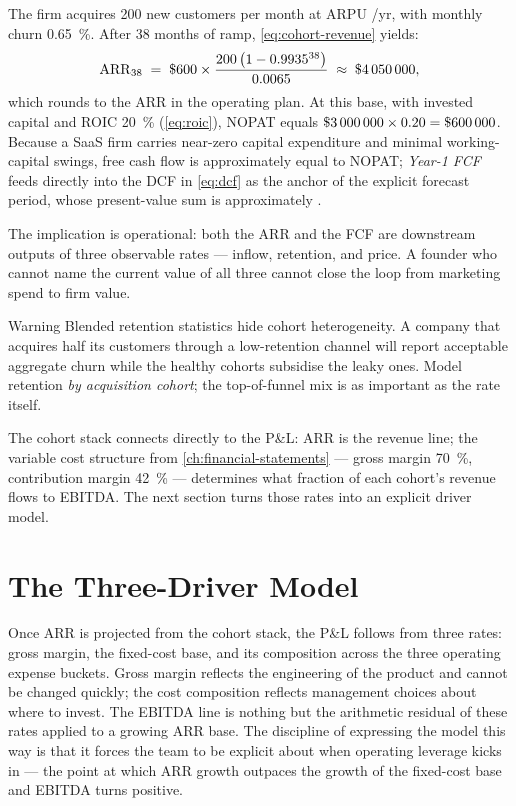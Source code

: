 \begin{example}
The firm acquires \num{200} new customers per month at ARPU /yr, with monthly churn
\qty{0.65}{\percent}. After \num{38} months of ramp, \cref{eq:cohort-revenue} yields:
\[
  \mathrm{ARR}_{38}
  \;=\; \$\num{600}\times
        \frac{200\,\bigl(1-0.9935^{38}\bigr)}{0.0065}
  \;\approx\; \$\num{4050000},
\]
which rounds to the  ARR in the operating plan. At this base, with invested
capital  and ROIC \qty{20}{\percent} (\cref{eq:roic}), NOPAT equals
\(\$\num{3000000}\times 0.20=\$\num{600000}\). Because a SaaS firm carries near-zero capital
expenditure and minimal working-capital swings, free cash flow is approximately equal to NOPAT;
\emph{Year-1 FCF } feeds directly into the DCF in \cref{eq:dcf} as the anchor
of the explicit forecast period, whose present-value sum is approximately .

The implication is operational: both the  ARR and the  FCF are
downstream outputs of three observable rates --- inflow, retention, and price. A founder who
cannot name the current value of all three cannot close the loop from marketing spend to
firm value.
\end{example}

\begin{admonition}{Warning}
Blended retention statistics hide cohort heterogeneity. A company that acquires half its
customers through a low-retention channel will report acceptable aggregate churn while the
healthy cohorts subsidise the leaky ones. Model retention \emph{by acquisition cohort}; the
top-of-funnel mix is as important as the rate itself.
\end{admonition}

The cohort stack connects directly to the P\&L: ARR is the revenue line; the variable cost
structure from \cref{ch:financial-statements} --- gross margin \qty{70}{\percent}, contribution
margin \qty{42}{\percent} --- determines what fraction of each cohort's revenue flows to
EBITDA. The next section turns those rates into an explicit driver model.


\section{The Three-Driver Model}\label{sec:three-driver-model}

Once ARR is projected from the cohort stack, the P\&L follows from three rates: gross margin,
the fixed-cost base, and its composition across the three operating expense buckets. Gross
margin reflects the engineering of the product and cannot be changed quickly; the cost
composition reflects management choices about where to invest. The EBITDA line is nothing but
the arithmetic residual of these rates applied to a growing ARR base. The discipline of
expressing the model this way is that it forces the team to be explicit about when operating
leverage kicks in --- the point at which ARR growth outpaces the growth of the fixed-cost
base and EBITDA turns positive.

